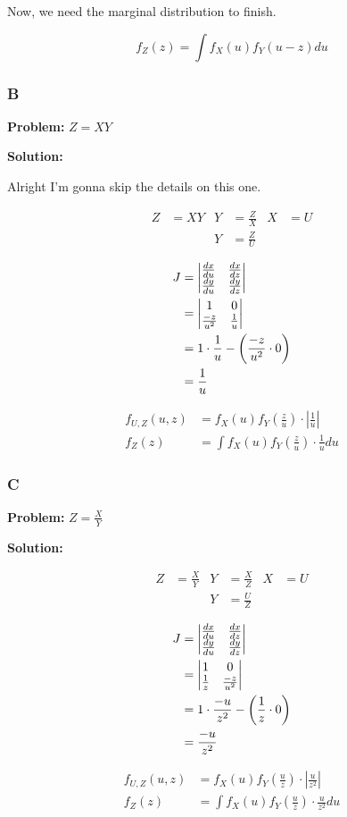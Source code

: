 Now, we need the marginal distribution to finish.

\[f_Z(z) = \int f_X(u) f_Y(u - z) du\]

\subsubsection*{B} \textbf{Problem:} $Z = XY$

\noindent\textbf{Solution:}

Alright I'm gonna skip the details on this one.

\begin{align*}
	Z &= XY & Y &= \frac{Z}{X} & X &= U \\
	&& Y &= \frac{Z}{U}
\end{align*}

\begin{align*}
	J &= \m{v}{\frac{dx}{du} & \frac{dx}{dz} \\ \frac{dy}{du} & \frac{dy}{dz}} \\
	&= \m{v}{1 & 0 \\ \frac{-z}{u^2} & \frac{1}{u}} \\
	&= 1 \cdot \frac{1}{u} - \left( \frac{-z}{u^2} \cdot 0 \right) \\
	&= \frac{1}{u}
\end{align*}

\begin{align*}
	f_{U,Z}(u,z) &= f_X(u) f_Y\left(\frac{z}{u}\right) \cdot \left| \frac{1}{u} \right| \\
	f_Z(z) &= \int  f_X(u) f_Y\left(\frac{z}{u}\right) \cdot \frac{1}{u} du 
\end{align*}

\subsubsection*{C} \textbf{Problem:} $Z = \frac{X}{Y}$

\noindent\textbf{Solution:}

\begin{align*}
	Z &=  \frac{X}{Y} & Y &= \frac{X}{Z} & X &= U \\
	&& Y &= \frac{U}{Z}
\end{align*}

\begin{align*}
	J &= \m{v}{\frac{dx}{du} & \frac{dx}{dz} \\ \frac{dy}{du} & \frac{dy}{dz}} \\
	&= \m{v}{1 & 0 \\ \frac{1}{z} & \frac{-z}{u^2}} \\
	&= 1 \cdot \frac{-u}{z^2} - \left( \frac{1}{z} \cdot 0 \right) \\
	&= \frac{-u}{z^2}
\end{align*}

\begin{align*}
	f_{U,Z}(u,z) &= f_X(u) f_Y\left(\frac{u}{z}\right) \cdot \left| \frac{u}{z^2} \right| \\
	f_Z(z) &= \int  f_X(u) f_Y\left(\frac{u}{z}\right) \cdot \frac{u}{z^2} du 
\end{align*}
